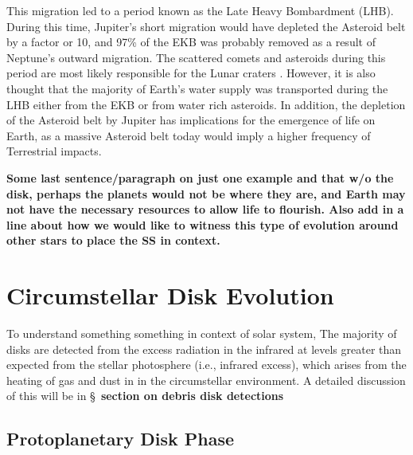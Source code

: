     This migration led to a period known as the Late Heavy Bombardment (LHB). During this time, Jupiter's short migration would have depleted the Asteroid belt by a factor or 10, and 97\% of the EKB was probably removed as a result of Neptune's outward migration. The scattered comets and asteroids during this period are most likely responsible for the Lunar craters \citep{Gomes2005}. However, it is also thought that the majority of Earth's water supply was transported during the LHB either from the EKB or from water rich asteroids. In addition, the depletion of the Asteroid belt by Jupiter has implications for the emergence of life on Earth, as a massive Asteroid belt today would imply a higher frequency of Terrestrial impacts. 
    
    \textbf{Some last sentence/paragraph on just one example and that w/o the disk, perhaps the planets would not be where they are, and Earth may not have the necessary resources to allow life to flourish. Also add in a line about how we would like to witness this type of evolution around other stars to place the SS in context.}
    
    




\section{Circumstellar Disk Evolution}
    
    To understand something something in context of solar system, 
    The majority of disks are detected from the excess radiation in the infrared at levels greater than expected from the stellar photosphere (i.e., infrared excess), which arises from the heating of gas and dust in in the circumstellar environment. A detailed discussion of this will be in \S~\textbf{section on debris disk detections}


    \subsection{Protoplanetary Disk Phase}
    
